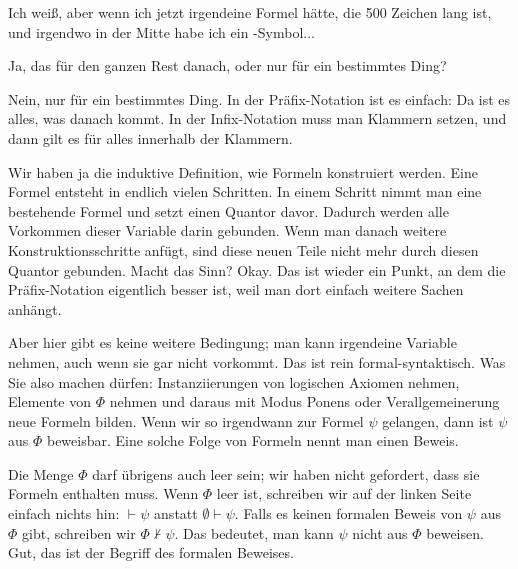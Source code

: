 \begin{spoken-clean}[00:27:06 - 00:27:30]
Ich weiß, aber wenn ich jetzt irgendeine Formel hätte, die 500 Zeichen lang ist, und irgendwo in der Mitte habe ich ein -Symbol... 
\end{spoken-clean}

\begin{student-interaction}[Studentenfrage]
Ja, das für den ganzen Rest danach, oder nur für ein bestimmtes Ding?
\end{student-interaction}

\begin{spoken-clean}[00:27:30 - 00:28:22]
Nein, nur für ein bestimmtes Ding. In der Präfix-Notation ist es einfach: Da ist es alles, was danach kommt. In der Infix-Notation muss man Klammern setzen, und dann gilt es für alles innerhalb der Klammern.

Wir haben ja die induktive Definition, wie Formeln konstruiert werden. Eine Formel entsteht in endlich vielen Schritten. In einem Schritt nimmt man eine bestehende Formel und setzt einen Quantor davor. Dadurch werden alle Vorkommen dieser Variable darin gebunden. Wenn man danach weitere Konstruktionsschritte anfügt, sind diese neuen Teile nicht mehr durch diesen Quantor gebunden. Macht das Sinn? Okay. Das ist wieder ein Punkt, an dem die Präfix-Notation eigentlich besser ist, weil man dort einfach weitere Sachen anhängt.
\end{spoken-clean}

\begin{spoken-clean}[00:28:22 - 00:31:22]
Aber hier gibt es keine weitere Bedingung; man kann irgendeine Variable nehmen, auch wenn sie gar nicht vorkommt. Das ist rein formal-syntaktisch. Was Sie also machen dürfen: Instanziierungen von logischen Axiomen nehmen, Elemente von $\Phi$ nehmen und daraus mit Modus Ponens oder Verallgemeinerung neue Formeln bilden. Wenn wir so irgendwann zur Formel $\psi$ gelangen, dann ist $\psi$ aus $\Phi$ beweisbar. Eine solche Folge von Formeln nennt man einen Beweis.

Die Menge $\Phi$ darf übrigens auch leer sein; wir haben nicht gefordert, dass sie Formeln enthalten muss. Wenn $\Phi$ leer ist, schreiben wir auf der linken Seite einfach nichts hin: $\vdash \psi$ anstatt $\emptyset \vdash \psi$. Falls es keinen formalen Beweis von $\psi$ aus $\Phi$ gibt, schreiben wir $\Phi \not\vdash \psi$. Das bedeutet, man kann $\psi$ nicht aus $\Phi$ beweisen. Gut, das ist der Begriff des formalen Beweises.
\end{spoken-clean}

